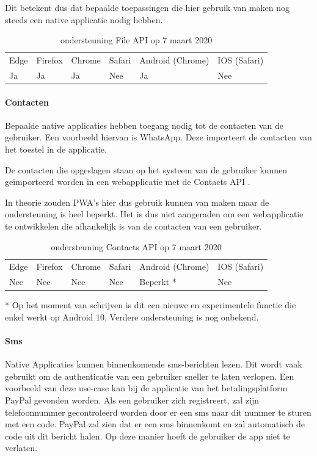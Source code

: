 Dit betekent dus dat bepaalde toepassingen die hier gebruik van maken nog steeds een native applicatie nodig hebben.

\begin{table}[H]
	\centering
	\begin{tabular}{llllll}
		Edge & Firefox & Chrome & Safari & Android (Chrome) & IOS (Safari) \\
		Ja   & Ja      &  Ja     & Nee     & Ja               & Nee          
	\end{tabular}	
	\caption{ondersteuning File API op 7 maart 2020}
\end{table}	


\paragraph{Contacten}
Bepaalde native applicaties hebben toegang nodig tot de contacten van de gebruiker. Een voorbeeld hiervan is WhatsApp. Deze importeert de contacten van het toestel in de applicatie.

De contacten die opgeslagen staan op het systeem van de gebruiker kunnen geïmporteerd worden in een webapplicatie met de Contacts API \autocite{Tibbett2014}.

In theorie zouden PWA's hier dus gebruik kunnen van maken maar de ondersteuning is heel beperkt. Het is dus niet aangeraden om een webapplicatie te ontwikkelen die afhankelijk is van de contacten van een gebruiker.

\begin{table}[H]
	\centering
	\begin{tabular}{llllll}
		Edge & Firefox & Chrome & Safari & Android (Chrome) & IOS (Safari) \\
		Nee   & Nee      &  Nee     & Nee     & Beperkt *               & Nee          
	\end{tabular}	
	\caption{ondersteuning Contacts API op 7 maart 2020}{ * Op het moment van schrijven is dit een nieuwe en experimentele functie die enkel werkt op 
	Android 10. Verdere ondersteuning is nog onbekend.}
\end{table}	


\paragraph{Sms}
Native Applicaties kunnen binnenkomende sms-berichten lezen. Dit wordt vaak gebruikt om de authenticatie van een gebruiker sneller te laten verlopen. Een voorbeeld van deze use-case kan bij de applicatie van het betalingsplatform PayPal gevonden worden. Als een gebruiker zich registreert, zal zijn telefoonnummer gecontroleerd worden door er een sms naar dit nummer te sturen met een code. PayPal zal zien dat er een sms binnenkomt en zal automatisch de code uit dit bericht halen. Op deze manier hoeft de gebruiker de app niet te verlaten.

